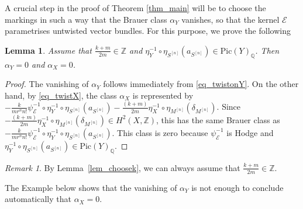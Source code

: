 \documentclass[12pt,a4paper]{amsart}
\theoremstyle{plain}
\newtheorem{lem}[thm]{Lemma}
\theoremstyle{definition}
\theoremstyle{remark}
\newtheorem{rmk}[thm]{Remark}
\def\Pic{\mathrm{Pic}}
\def\Z{\mathbb{Z}}
\def\QQ{\mathbb{Q}}
\newcommand{\rathodge}[1]{\psi_{#1}}
\begin{document}
A crucial step in the proof of Theorem \ref{thm_main} will be to choose the markings in such a way that the Brauer class $\alpha_Y$ vanishes, so that the kernel $\mathcal{E}$ parametrises untwisted vector bundles. For this purpose, we prove the following 
\begin{lem}\label{lem_sufficientcondition}
    Assume that $\frac{k+m}{2m}\in\Z$ and $\eta_{Y}^{-1}\circ \eta_{S^{[n]}}(a_{S^{[n]}})\in\Pic(Y)_{\mathbb{Q}}$. Then $\alpha_Y=0$ and $\alpha_X=0$.  
\end{lem}
\begin{proof}
    The vanishing of $\alpha_Y$ follows immediately from \eqref{eq_twistonY}. On the other hand, by \eqref{eq_twistX}, the class $\alpha_X$ is represented by $-\frac{k}{mr^nn!}\rathodge{\mathcal{E}}^{-1}\circ\eta_{Y}^{-1}\circ \eta_{S^{[n]}}(a_{S^{[n]}})-\frac{(k+m)}{2m}\eta_X^{-1}\circ\eta_{M^{[n]}}(\delta_{M^{[n]}})$. Since $-\frac{(k+m)}{2m}\eta_X^{-1}\circ\eta_{M^{[n]}}(\delta_{M^{[n]}})\in H^2(X,\Z)$, this has the same Brauer class as $-\frac{k}{m r^nn!}\rathodge{\mathcal{E}}^{-1}\circ\eta_{Y}^{-1}\circ \eta_{S^{[n]}}(a_{S^{[n]}})$. This class is zero because $\rathodge{\mathcal{E}}^{-1}$ is Hodge and $\eta_Y^{-1}\circ \eta_{S^{[n]}}(a_{S^{[n]}})\in \Pic(Y)_\QQ$.
\end{proof}

\begin{rmk}\label{rmk_nicotranquillo}
    By Lemma~\ref{lem_choosek}, we can always assume that $\frac{k+m}{2m}\in\Z$.
\end{rmk}

The Example below shows that the vanishing of $\alpha_Y$ is not enough to conclude automatically that $\alpha_X=0$.
\end{document}
